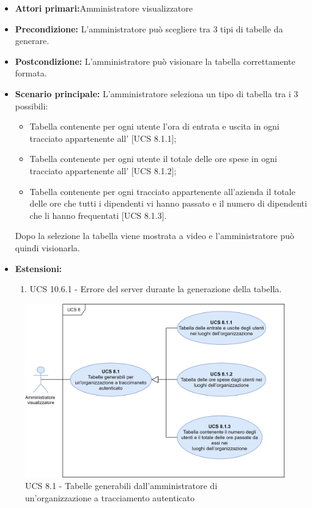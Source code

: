 \begin{itemize}
\item \textbf{Attori primari:}Amministratore visualizzatore
\item \textbf{Precondizione:} L'amministratore può scegliere tra 3 tipi di tabelle da generare.
\item \textbf{Postcondizione:} L'amministratore può visionare la tabella correttamente formata.
\item \textbf{Scenario principale:} L'amministratore seleziona un tipo di tabella tra i 3 possibili:
	\begin{itemize}%
	\item Tabella contenente per ogni utente l'ora di entrata e uscita in ogni  tracciato appartenente all' [UCS 8.1.1];
	\item Tabella contenente per ogni utente il totale delle ore spese in ogni  tracciato appartenente all' [UCS 8.1.2];
	\item Tabella contenente per ogni  tracciato appartenente all'azienda il totale delle ore che tutti i dipendenti vi hanno passato e il numero di dipendenti che li hanno frequentati [UCS 8.1.3].
\end{itemize}
Dopo la selezione la tabella viene mostrata a video e l'amministratore può quindi visionarla.
\item \textbf{Estensioni:}
	\begin{enumerate}
		\item UCS 10.6.1 - Errore del server durante la generazione della tabella.
	\end{enumerate}
\end{itemize}

\begin{figure}[h!]
	\centering
    \includegraphics[scale=0.53]{Sezioni/UseCase/Immagini/UCS8.1.png}
    \caption{UCS 8.1 - Tabelle generabili dall'amministratore di un'organizzazione a tracciamento autenticato}
\end{figure}

